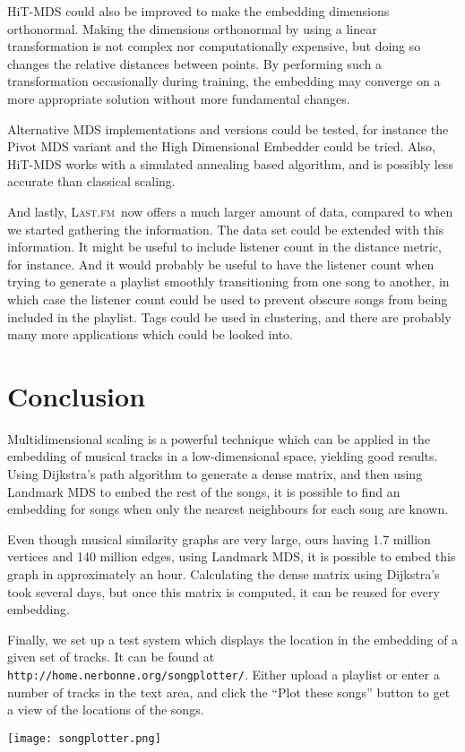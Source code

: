 \documentclass[10pt,fleqn,a4paper]{article}
\newcommand{\lastfm}{\textsc{Last.fm}}
\begin{document}
\begin{twocolumn}
HiT-MDS could also be improved to make the embedding dimensions orthonormal.  Making the dimensions orthonormal by using a linear transformation is not complex nor computationally expensive, but doing so changes the relative distances between points.  By performing such a transformation occasionally during training, the embedding may converge on a more appropriate solution without more fundamental changes.

Alternative MDS implementations and versions could be tested, for instance the Pivot MDS variant and the High Dimensional Embedder could be tried. Also, HiT-MDS works with a simulated annealing based algorithm, and is possibly less accurate than classical scaling.

And lastly, \lastfm~now offers a much larger amount of data, compared to when we started gathering the information. The data set could be extended with this information. It might be useful to include listener count in the distance metric, for instance. And it would probably be useful to have the listener count when trying to generate a playlist smoothly transitioning from one song to another, in which case the listener count could be used to prevent obscure songs from being included in the playlist. Tags could be used in clustering, and there are probably many more applications which could be looked into.

\section{Conclusion}

Multidimensional scaling is a powerful technique which can be applied in the embedding of musical tracks in a low-dimensional space, yielding good results. Using Dijkstra's path algorithm to generate a dense matrix, and then using Landmark MDS to embed the rest of the songs, it is possible to find an embedding for songs when only the nearest neighbours for each song are known.

Even though musical similarity graphs are very large, ours having 1.7 million vertices and 140 million edges, using Landmark MDS, it is possible to embed this graph in approximately an hour. Calculating the dense matrix using Dijkstra's took several days, but once this matrix is computed, it can be reused for every embedding.

Finally, we set up a test system which displays the location in the embedding of a given set of tracks. It can be found at \verb|http://home.nerbonne.org/songplotter/|. Either upload a playlist or enter a number of tracks in the text area, and click the ``Plot these songs'' button to get a view of the locations of the songs.

\begin{center}\texttt{[image: songplotter.png]}\end{center}





\end{twocolumn}
\end{document}
